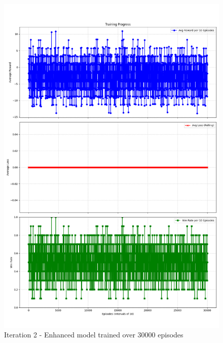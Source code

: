 \begin{figure}[H]
    \includegraphics[width=.8\textwidth]{assets/Iteration-2-graphs.png}
    \caption{Iteration 2 - Enhanced model trained over 30000 episodes}
    \label{fig:iteration-2-graphs}
\end{figure}